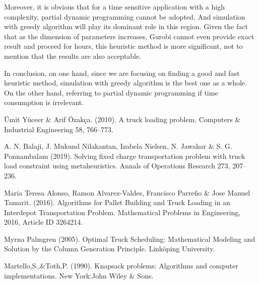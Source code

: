 \documentclass{article}
\begin{document}
Moreover, it is obvious that for a time sensitive application with a high complexity, partial dynamic programming cannot be adopted. And simulation with greedy algorithm will play its dominant role in this region. Given the fact that as the dimension of parameters increases, Gurobi cannot even provide exact result and proceed for hours, this heuristic method is more significant, not to mention that the results are also acceptable.

In conclusion, on one hand, since we are focusing on finding a good and fast heuristic method, simulation with greedy algorithm is the best one as a whole. On the other hand, referring to partial dynamic programming if time consumption is irrelevant. 

  

\begin{thebibliography}{1}

Ümit Yüceer \& Arif Özakça. (2010). 
\newblock A truck loading problem. Computers \& Industrial Engineering 58, 766–773.

A. N. Balaji, J. Mukund Nilakantan, Izabela Nielsen, N. Jawahar \& S. G. Ponnambalam (2019).
\newblock Solving fixed charge transportation problem with truck load constraint using metaheuristics. Annals of Operations Research 273, 207–236.

Maria Teresa Alonso, Ramon Alvarez-Valdes, Francisco Parreño \& Jose Manuel Tamarit. (2016).
\newblock Algorithms for Pallet Building and Truck Loading in an Interdepot Transportation Problem. Mathematical Problems in Engineering, 2016, Article ID 3264214.

Myrna Palmgren (2005).
\newblock Optimal Truck Scheduling: Mathematical Modeling and Solution by the Column Generation Principle. Linköping University.

Martello,S.,\&Toth,P. (1990).
\newblock Knapsack problems: Algorithms and computer implementations. New York:John Wiley \& Sons.

\end{thebibliography}
\end{document}
